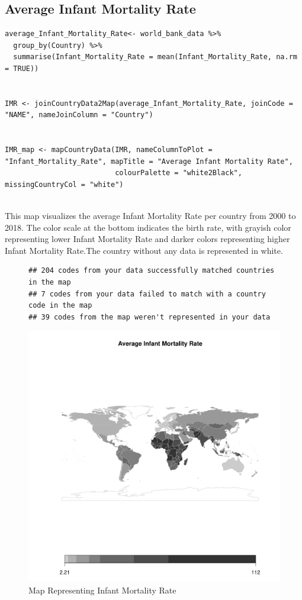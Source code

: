 \documentclass{article}\usepackage[]{graphicx}\usepackage[]{xcolor}
\makeatletter
\def\maxwidth{ %
  \ifdim\Gin@nat@width>\linewidth
    \linewidth
  \else
    \Gin@nat@width
  \fi
}
\newenvironment{kframe}{%
 \def\at@end@of@kframe{}%
 \ifinner\ifhmode%
  \def\at@end@of@kframe{\end{minipage}}%
  \begin{minipage}{\columnwidth}%
 \fi\fi%
 \def\FrameCommand##1{\hskip\@totalleftmargin \hskip-\fboxsep
 \colorbox{shadecolor}{##1}\hskip-\fboxsep
     \hskip-\linewidth \hskip-\@totalleftmargin \hskip\columnwidth}%
 \MakeFramed {\advance\hsize-\width
   \@totalleftmargin\z@ \linewidth\hsize
   \@setminipage}}%
 {\par\unskip\endMakeFramed%
 \at@end@of@kframe}
\newenvironment{knitrout}{}{} %
\makeatother
\begin{document}
\subsection{Average Infant Mortality Rate}
\begin{lstlisting}
average_Infant_Mortality_Rate<- world_bank_data %>%
  group_by(Country) %>%
  summarise(Infant_Mortality_Rate = mean(Infant_Mortality_Rate, na.rm = TRUE))


IMR <- joinCountryData2Map(average_Infant_Mortality_Rate, joinCode = "NAME", nameJoinColumn = "Country")


IMR_map <- mapCountryData(IMR, nameColumnToPlot = "Infant_Mortality_Rate", mapTitle = "Average Infant Mortality Rate", 
                          colourPalette = "white2Black", missingCountryCol = "white")


\end{lstlisting}
This map visualizes the average Infant Mortality Rate per country from 2000 to 2018. The color scale at the bottom indicates the birth rate, with grayish color representing lower Infant Mortality Rate and darker colors representing higher Infant Mortality Rate.The country without any data is represented in white.
\newpage
\begin{figure}[h!]
\centering
\begin{knitrout}
\color{fgcolor}\begin{kframe}
\begin{verbatim}
## 204 codes from your data successfully matched countries in the map
## 7 codes from your data failed to match with a country code in the map
## 39 codes from the map weren't represented in your data
\end{verbatim}
\end{kframe}
\includegraphics[width=\maxwidth]{figure/unnamed-chunk-22-1} 
\end{knitrout}
\caption{Map Representing Infant Mortality Rate}

\label{fig}
\end{figure}
\end{document}
